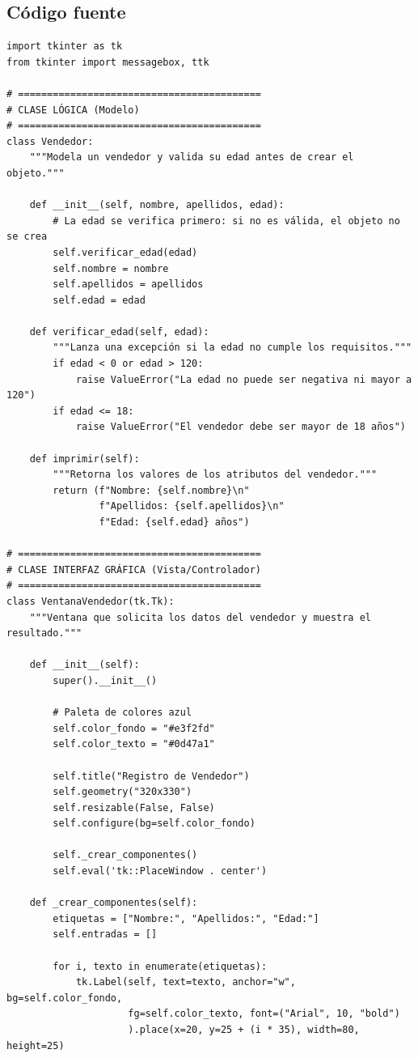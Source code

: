 \documentclass[11pt, a4paper]{article}
\begin{document}
\subsection{Código fuente}
\begin{lstlisting}
import tkinter as tk
from tkinter import messagebox, ttk

# ==========================================
# CLASE LÓGICA (Modelo)
# ==========================================
class Vendedor:
    """Modela un vendedor y valida su edad antes de crear el objeto."""

    def __init__(self, nombre, apellidos, edad):
        # La edad se verifica primero: si no es válida, el objeto no se crea
        self.verificar_edad(edad)
        self.nombre = nombre
        self.apellidos = apellidos
        self.edad = edad

    def verificar_edad(self, edad):
        """Lanza una excepción si la edad no cumple los requisitos."""
        if edad < 0 or edad > 120:
            raise ValueError("La edad no puede ser negativa ni mayor a 120")
        if edad <= 18:
            raise ValueError("El vendedor debe ser mayor de 18 años")

    def imprimir(self):
        """Retorna los valores de los atributos del vendedor."""
        return (f"Nombre: {self.nombre}\n"
                f"Apellidos: {self.apellidos}\n"
                f"Edad: {self.edad} años")

# ==========================================
# CLASE INTERFAZ GRÁFICA (Vista/Controlador)
# ==========================================
class VentanaVendedor(tk.Tk):
    """Ventana que solicita los datos del vendedor y muestra el resultado."""

    def __init__(self):
        super().__init__()

        # Paleta de colores azul
        self.color_fondo = "#e3f2fd"
        self.color_texto = "#0d47a1"

        self.title("Registro de Vendedor")
        self.geometry("320x330")
        self.resizable(False, False)
        self.configure(bg=self.color_fondo)

        self._crear_componentes()
        self.eval('tk::PlaceWindow . center')

    def _crear_componentes(self):
        etiquetas = ["Nombre:", "Apellidos:", "Edad:"]
        self.entradas = []

        for i, texto in enumerate(etiquetas):
            tk.Label(self, text=texto, anchor="w", bg=self.color_fondo,
                     fg=self.color_texto, font=("Arial", 10, "bold")
                     ).place(x=20, y=25 + (i * 35), width=80, height=25)


\end{lstlisting}
\end{document}
